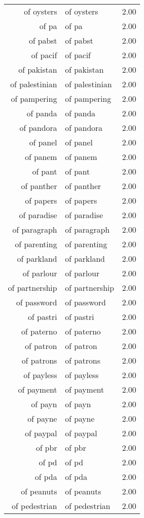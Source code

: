 \begin{table}[ht]
\begin{tabular}{rlr}
  of oysters & of oysters & 2.00 \\ 
  of pa & of pa & 2.00 \\ 
  of pabst & of pabst & 2.00 \\ 
  of pacif & of pacif & 2.00 \\ 
  of pakistan & of pakistan & 2.00 \\ 
  of palestinian & of palestinian & 2.00 \\ 
  of pampering & of pampering & 2.00 \\ 
  of panda & of panda & 2.00 \\ 
  of pandora & of pandora & 2.00 \\ 
  of panel & of panel & 2.00 \\ 
  of panem & of panem & 2.00 \\ 
  of pant & of pant & 2.00 \\ 
  of panther & of panther & 2.00 \\ 
  of papers & of papers & 2.00 \\ 
  of paradise & of paradise & 2.00 \\ 
  of paragraph & of paragraph & 2.00 \\ 
  of parenting & of parenting & 2.00 \\ 
  of parkland & of parkland & 2.00 \\ 
  of parlour & of parlour & 2.00 \\ 
  of partnership & of partnership & 2.00 \\ 
  of password & of password & 2.00 \\ 
  of pastri & of pastri & 2.00 \\ 
  of paterno & of paterno & 2.00 \\ 
  of patron & of patron & 2.00 \\ 
  of patrons & of patrons & 2.00 \\ 
  of payless & of payless & 2.00 \\ 
  of payment & of payment & 2.00 \\ 
  of payn & of payn & 2.00 \\ 
  of payne & of payne & 2.00 \\ 
  of paypal & of paypal & 2.00 \\ 
  of pbr & of pbr & 2.00 \\ 
  of pd & of pd & 2.00 \\ 
  of pda & of pda & 2.00 \\ 
  of peanuts & of peanuts & 2.00 \\ 
  of pedestrian & of pedestrian & 2.00 \\ 

\end{tabular}
\end{table}
